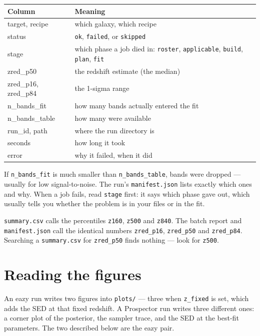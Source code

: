 \documentclass[11pt]{article}
\begin{document}
\begin{center}
\begin{tabular}{>{\ttfamily}l p{8.8cm}}
\toprule
\textbf{\normalfont Column} & \textbf{Meaning} \\
\midrule
target, recipe & which galaxy, which recipe \\
status & \texttt{ok}, \texttt{failed}, or \texttt{skipped} \\
stage & which phase a job died in: \texttt{roster},
  \texttt{applicable}, \texttt{build}, \texttt{plan}, \texttt{fit} \\
zred\_p50 & the redshift estimate (the median) \\
zred\_p16, zred\_p84 & the 1-sigma range \\
n\_bands\_fit & how many bands actually entered the fit \\
n\_bands\_table & how many were available \\
run\_id, path & where the run directory is \\
seconds & how long it took \\
error & why it failed, when it did \\
\bottomrule
\end{tabular}
\end{center}

If \texttt{n\_bands\_fit} is much smaller than \texttt{n\_bands\_table},
bands were dropped --- usually for low signal-to-noise. The run's
\texttt{manifest.json} lists exactly which ones and why. When a job
fails, read \texttt{stage} first: it says which phase gave out, which
usually tells you whether the problem is in your files or in the fit.

\begin{notebox}
\texttt{summary.csv} calls the percentiles \texttt{z160},
\texttt{z500} and \texttt{z840}. The batch report and
\texttt{manifest.json} call the identical numbers \texttt{zred\_p16},
\texttt{zred\_p50} and \texttt{zred\_p84}. Searching a
\texttt{summary.csv} for \texttt{zred\_p50} finds nothing --- look for
\texttt{z500}.
\end{notebox}

\section{Reading the figures}

An eazy run writes two figures into \texttt{plots/} --- three when
\texttt{z\_fixed} is set, which adds the SED at that fixed redshift. A
Prospector run writes three different ones: a corner plot of the
posterior, the sampler trace, and the SED at the best-fit parameters.
The two described below are the eazy pair.
\end{document}
